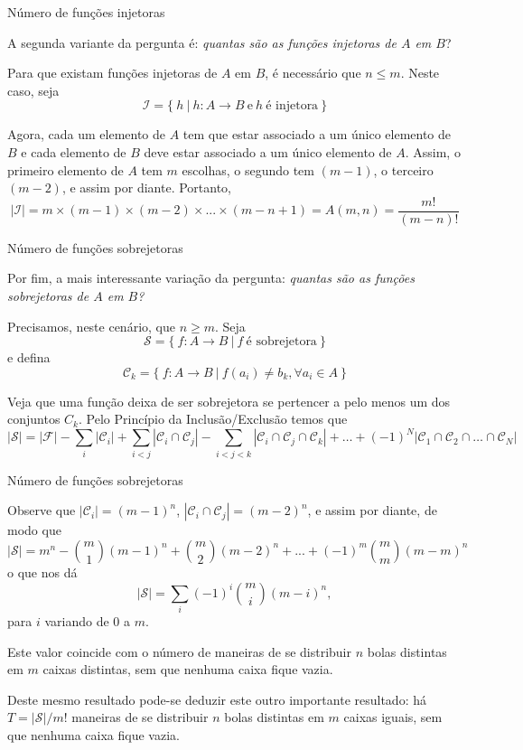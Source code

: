\begin{frame}[fragile]{Número de funções injetoras}

A segunda variante da pergunta é: {\it quantas são as funções injetoras de $A$ em $B$}?

Para que existam funções injetoras de $A$ em $B$, é necessário que $n \leq m$. Neste caso, seja 
\[
\mathcal{I} = \{\ h\ |\ h: A \to B\ \mbox{e}\ h\ \mbox{é injetora}\ \}
\]

 Agora, cada um elemento de $A$ tem que estar associado a um
único elemento de $B$ e cada elemento de $B$ deve estar associado a um único elemento de $A$.
Assim, o primeiro elemento de $A$ tem $m$ escolhas, o segundo tem $(m - 1)$, o terceiro $(m - 2)$,
e assim por diante. Portanto,
\[
        |\mathcal{I}| = m \times (m - 1) \times (m - 2) \times ... \times (m - n + 1) = A(m, n) = \frac{m!}{(m - n)!}
\]

\end{frame}

\begin{frame}[fragile]{Número de funções sobrejetoras}

Por fim, a mais interessante variação da pergunta: {\it quantas são as funções sobrejetoras de $A$ em $B$?}

Precisamos, neste cenário, que $n \geq m$. Seja
\[
    \mathcal{S} = \{\ f: A \to B\ |\ f\ \mbox{é sobrejetora}\ \}
\]
e defina 
\[
\mathcal{C}_k = \{\ f: A \to B\ |\ f(a_i) \neq b_k, \forall a_i\in A\ \}
\]

Veja que uma função deixa de ser sobrejetora se pertencer a pelo menos um
dos conjuntos $C_k$. Pelo Princípio da Inclusão/Exclusão temos que
\[
        |\mathcal{S}| = |\mathcal{F} | - \sum_{i} | \mathcal{C}_i | + \sum_{i<j}| \mathcal{C}_i \cap \mathcal{C}_j | - \sum_{i<j<k}| \mathcal{C}_i \cap
            \mathcal{C}_j \cap \mathcal{C}_k | + \ldots + (-1)^N | \mathcal{C}_1 \cap \mathcal{C}_2 \cap \ldots \cap \mathcal{C}_N |
\]

\end{frame}

\begin{frame}[fragile]{Número de funções sobrejetoras}

Observe que $|\mathcal{C}_i| = (m - 1)^n$, $|\mathcal{C}_i \cap \mathcal{C}_j| = (m - 2)^n$, e assim por diante, de modo que
\[
        | \mathcal{S} | = m^n - \binom{m}{1} (m - 1)^n + \binom{m}{2} (m - 2)^n 
              + ... + (-1)^m \binom{m}{m} (m - m)^n
\]
o que nos dá
\[
        | \mathcal{S} | = \sum_{i} (-1)^i \binom{m}{i} (m - i)^n,
\]
para $i$ variando de 0 a $m$.

Este valor coincide com o número de maneiras de se distribuir $n$ bolas distintas em $m$ 
caixas distintas, sem que nenhuma caixa fique vazia.

Deste mesmo resultado pode-se deduzir este outro importante resultado: há $T = |\mathcal{S} | / m!$ maneiras
de se distribuir $n$ bolas distintas em $m$ caixas iguais, sem que nenhuma caixa fique vazia.


\end{frame}

